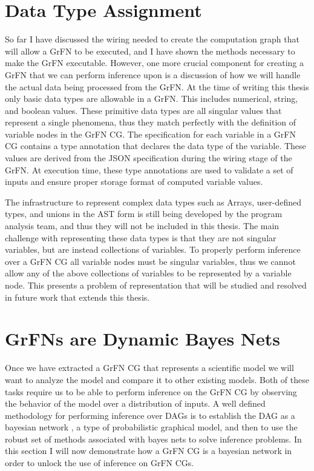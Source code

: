\section{Data Type Assignment\label{sec:data_types}}
So far I have discussed the wiring needed to create the computation graph that will allow a GrFN to be executed, and I have shown the methods necessary to make the GrFN executable. However, one more crucial component for creating a GrFN that we can perform inference upon is a discussion of how we will handle the actual data being processed from the GrFN. At the time of writing this thesis only basic data types are allowable in a GrFN. This includes numerical, string, and boolean values. These primitive data types are all singular values that represent a single phenomena, thus they match perfectly with the definition of variable nodes in the GrFN CG. The specification for each variable in a GrFN CG contains a type annotation that declares the data type of the variable. These values are derived from the JSON specification during the wiring stage of the GrFN. At execution time, these type annotations are used to validate a set of inputs and ensure proper storage format of computed variable values.

The infrastructure to represent complex data types such as Arrays, user-defined types, and unions in the AST form is still being developed by the program analysis team, and thus they will not be included in this thesis. The main challenge with representing these data types is that they are not singular variables, but are instead collections of variables. To properly perform inference over a GrFN CG all variable nodes must be singular variables, thus we cannot allow any of the above collections of variables to be represented by a variable node. This presents a problem of representation that will be studied  and resolved in future work that extends this thesis.

\section{GrFNs are Dynamic Bayes Nets\label{sec:grfn_as_dbn}}
Once we have extracted a GrFN CG that represents a scientific model we will want to analyze the model and compare it to other existing models.
Both of these tasks require us to be able to perform inference on the GrFN CG by observing the behavior of the model over a distribution of inputs.
A well defined methodology for performing inference over DAGs is to establish the DAG as a bayesian network \citep{bishop2006pattern}, a type of probabilistic graphical model, and then to use the robust set of methods associated with bayes nets to solve inference problems.
In this section I will now demonstrate how a GrFN CG is a bayesian network in order to unlock the use of inference on GrFN CGs.


